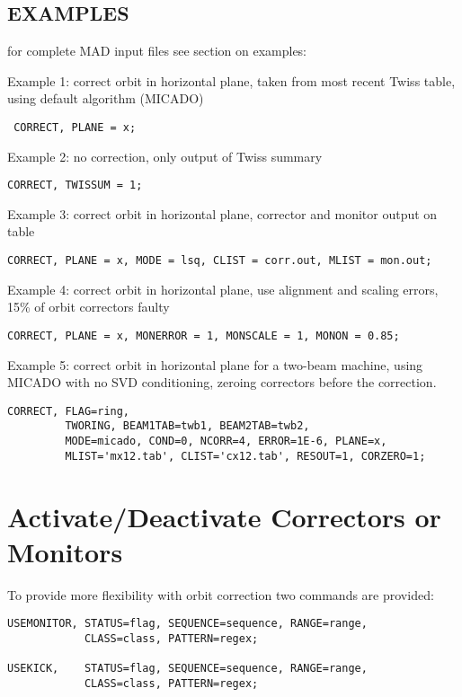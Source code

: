 \subsection{EXAMPLES} 
for complete MAD input files see section on examples:

Example 1: correct orbit in horizontal plane, taken from most recent
Twiss table, using default algorithm (MICADO)
\begin{verbatim}
 CORRECT, PLANE = x; 
\end{verbatim}

Example 2: no correction, only output of Twiss summary 
\begin{verbatim}
CORRECT, TWISSUM = 1; 
\end{verbatim}

Example 3: correct orbit in horizontal plane, corrector and monitor
output on table 
\begin{verbatim}
CORRECT, PLANE = x, MODE = lsq, CLIST = corr.out, MLIST = mon.out;   
\end{verbatim}

Example 4: correct orbit in horizontal plane, use alignment and scaling
errors, 15\% of orbit correctors faulty
\begin{verbatim}
CORRECT, PLANE = x, MONERROR = 1, MONSCALE = 1, MONON = 0.85; 
\end{verbatim}

Example 5: correct orbit in horizontal plane for a two-beam machine,
using MICADO with no SVD conditioning, zeroing correctors before the
correction. 
\begin{verbatim}
CORRECT, FLAG=ring,
         TWORING, BEAM1TAB=twb1, BEAM2TAB=twb2,
         MODE=micado, COND=0, NCORR=4, ERROR=1E-6, PLANE=x,
         MLIST='mx12.tab', CLIST='cx12.tab', RESOUT=1, CORZERO=1;
\end{verbatim}




%
\section{Activate/Deactivate Correctors or Monitors}
\label{sec:activate}
To provide more flexibility with orbit correction two commands are
provided:  

\begin{verbatim}
USEMONITOR, STATUS=flag, SEQUENCE=sequence, RANGE=range, 
            CLASS=class, PATTERN=regex;

USEKICK,    STATUS=flag, SEQUENCE=sequence, RANGE=range,
            CLASS=class, PATTERN=regex;
\end{verbatim}

